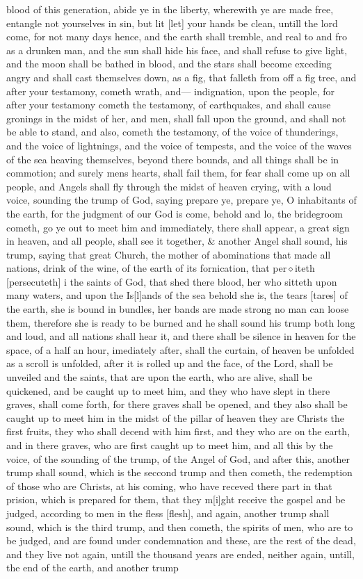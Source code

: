 blood of this generation, abide ye in the liberty, wherewith ye are made free, entangle not yourselves in sin, but lit [let] your hands be clean, untill the lord come, for not many days hence, and the earth shall tremble, and real to and fro as a drunken man, and the sun shall hide his face, and shall refuse to give light, and the moon shall be bathed in blood, and the stars shall become exceding angry and shall cast themselves down, as a fig, that falleth from off a fig tree, and after your testamony, cometh wrath, and--- indignation, upon the people, for after your testamony cometh the testamony, of earthquakes, and shall cause gronings in the midst of her, and men, shall fall upon the ground, and shall not be able to stand, and also, cometh the testamony, of the voice of thunderings, and the voice of lightnings, and the voice of tempests, and the voice of the waves of the sea heaving themselves, beyond there bounds, and all things shall be in commotion; and surely mens hearts, shall fail them, for fear shall come up on all people, and Angels shall fly through the midst of heaven crying, with a loud voice, sounding the trump of God, saying prepare ye, prepare ye, O inhabitants of the earth, for the judgment of our God is come, behold and lo, the bridegroom cometh, go ye out to meet him and immediately, there shall appear, a great sign in heaven, and all people, shall see it together, \& another Angel shall sound, his trump, saying that great Church, the mother of abominations that made all nations, drink of the wine, of the earth of its fornication, that per$\diamond$iteth [persecuteth] i the saints of God, that shed there blood, her who sitteth upon many waters, and upon the Is[l]ands of the sea behold she is, the tears [tares] of the earth, she is bound in bundles, her bands are made strong no man can loose them, therefore she is ready to be burned and he shall sound his trump both long and loud, and all nations shall hear it, and there shall be silence in heaven for the space, of a half an hour, imediately after, shall the curtain, of heaven be unfolded as a scroll is unfolded, after it is rolled up and the face, of the Lord, shall be unveiled and the saints, that are upon the earth, who are alive, shall be quickened, and be caught up to meet him, and they who have slept in there graves, shall come forth, for there graves shall be opened, and they also shall be caught up to meet him in the midst of the pillar of heaven they are Christs the first fruits, they who shall decend with him first, and they who are on the earth, and in there graves, who are first caught up to meet him, and all this by the voice, of the sounding of the trump, of the Angel of God, and after this, another trump shall sound, which is the seccond trump and then cometh, the redemption of those who are Christs, at his coming, who have receved there part in that prision, which is prepared for them, that they m[i]ght receive the gospel and be judged, according to men in the fless [flesh], and again, another trump shall sound, which is the third trump, and then cometh, the spirits of men, who are to be judged, and are found under condemnation and these, are the rest of the dead, and they live not again, untill the thousand years are ended, neither again, untill, the end of the earth, and another trump 